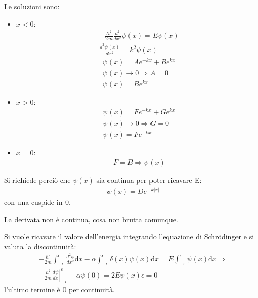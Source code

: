 Le soluzioni sono:
\begin{itemize}
\item $x<0$:
\begin{equation}\begin{split}
-\frac{\hbar ^2}{2m}\frac{d^2}{dx^2}\psi \left(x\right)=E\psi \left(x\right) \\
\frac{d^2\psi \left(x\right)}{dx^2}=k^2\psi\left(x\right)
\end{split}\end{equation}
\begin{equation}\begin{split}
\psi \left(x\right)=Ae^{-kx}+Be^{kx} \\
\psi \left(x\right) \rightarrow 0 \Longrightarrow A=0\\
\psi \left(x\right)=Be^{kx}
\end{split}\end{equation}
\item $x>0$:
\begin{equation}\begin{split}
\psi \left(x\right)=Fe^{-kx}+Ge^{kx} \\
\psi \left(x\right) \rightarrow 0 \Longrightarrow G=0\\
\psi \left(x\right)=Fe^{-kx}
\end{split}\end{equation}
\item $x=0$:
\begin{equation}\begin{split}
F=B \Longrightarrow \psi \left(x\right)
\end{split}\end{equation}
\end{itemize}

Si richiede perciò che $\psi \left(x\right)$ sia continua per poter ricavare E:
\begin{equation}\begin{split}
\psi \left(x\right)=De^{-k|x|}
\end{split}\end{equation}
con una cuspide in 0.

La derivata non è continua, cosa non brutta comunque.

Si vuole ricavare il valore dell'energia integrando l'equazione di Schrödinger e si valuta la discontinuità:
\begin{equation}\begin{split}
-\frac{\hbar ^2}{2m}\int_{-\epsilon}^{\epsilon}{\frac{d^2\psi }{dx^2} \textrm{d}x}-\alpha \int_{-\epsilon}^{\epsilon}{\delta\left(x\right)\psi \left(x\right) \textrm{d}x}=E\int_{-\epsilon}^{\epsilon}{\psi \left(x\right) \textrm{d}x} \Longrightarrow \\
\left.  -\frac{\hbar ^2}{2m} \frac{d\psi }{dx} \right |_{-\epsilon}^{\epsilon}-\alpha \psi \left(0\right)=2E\psi \left(x\right)\epsilon=0
\end{split}\end{equation}
l'ultimo termine è $0$ per continuità.

